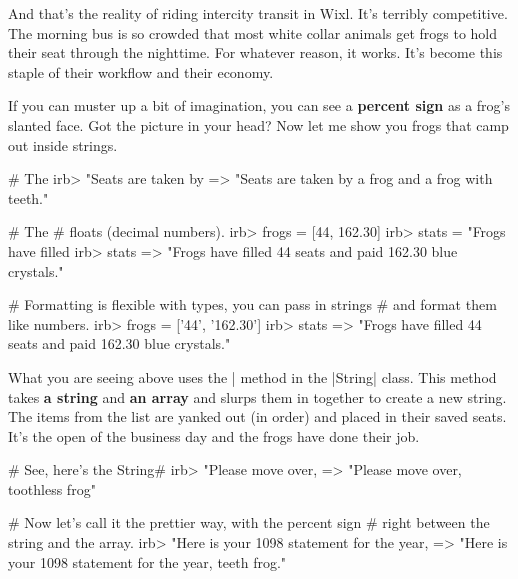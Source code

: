 \documentclass[12pt,twoside]{report}
\begin{document}
And that's the reality of riding intercity transit in Wixl.  It's
terribly competitive.  The morning bus is so crowded that most white
collar animals get frogs to hold their seat through the nighttime. For
whatever reason, it works.  It's become this staple of their workflow
and their economy.

If you can muster up a bit of imagination, you can see a {\bf percent
  sign} as a frog's slanted face. Got the picture in your head?  Now
let me show you frogs that camp out inside strings.


\begin{consolecode}

 # The %
 irb> "Seats are taken by %
   => "Seats are taken by a frog and a frog with teeth."

 # The %
 # floats (decimal numbers).
 irb> frogs = [44, 162.30]
 irb> stats = "Frogs have filled %
 irb> stats %
   => "Frogs have filled 44 seats and paid 162.30 blue crystals."

 # Formatting is flexible with types, you can pass in strings
 # and format them like numbers.
 irb> frogs = ['44', '162.30']
 irb> stats %
   => "Frogs have filled 44 seats and paid 162.30 blue crystals."

\end{consolecode}


What you are seeing above uses the \rubyinline|%
method in the \rubyinline|String| class. This method
takes {\bf a string} and {\bf an array} and slurps them in together to
create a new string.  The items from the list are yanked out (in
order) and placed in their saved seats.  It's the open of the business
day and the frogs have done their job.


\begin{consolecode}

 # See, here's the String#%
 irb> "Please move over, %
   => "Please move over, toothless frog"

 # Now let's call it the prettier way, with the percent sign
 # right between the string and the array.
 irb> "Here is your 1098 statement for the year, %
   => "Here is your 1098 statement for the year, teeth frog."

\end{consolecode}
\end{document}
